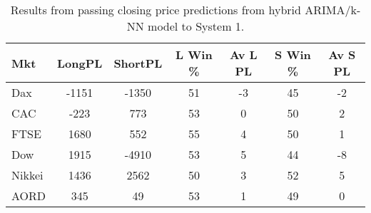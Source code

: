 \begin{table}[ht]
\centering
\caption[Results from passing closing price predictions from hybrid ARIMA/k-NN model to System 1]{Results from passing closing price predictions from hybrid ARIMA/k-NN model to System 1.} 
\label{tab:chp_ts:pred_close_arima_knn_sys1}
\begin{tabular}{lcccccc}
  \toprule Mkt & LongPL & ShortPL & L Win \% & Av L PL & S Win \% & Av S PL \\ 
  \midrule Dax & -1151 & -1350 & 51 & -3 & 45 & -2 \\ 
  CAC & -223 & 773 & 53 & 0 & 50 & 2 \\ 
  FTSE & 1680 & 552 & 55 & 4 & 50 & 1 \\ 
  Dow & 1915 & -4910 & 53 & 5 & 44 & -8 \\ 
  Nikkei & 1436 & 2562 & 50 & 3 & 52 & 5 \\ 
  AORD & 345 & 49 & 53 & 1 & 49 & 0 \\ 
   \bottomrule \end{tabular}
\end{table}
